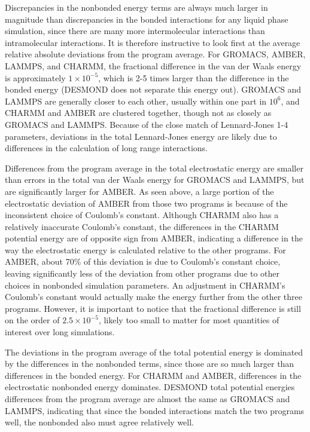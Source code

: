 Discrepancies in the nonbonded energy terms are always much larger in
magnitude than discrepancies in the bonded interactions for any liquid
phase simulation, since there are many more intermolecular
interactions than intramolecular interactions.  It is therefore
instructive to look first at the average relative absolute deviations
from the program average. For GROMACS, AMBER, LAMMPS, and CHARMM, the
fractional difference in the van der Waals energy is approximately
$1\times 10^{-5}$, which is 2-5 times larger than the difference in
the bonded energy (DESMOND does not separate this energy out). GROMACS
and LAMMPS are generally closer to each other, usually within one part
in $10^6$, and CHARMM and AMBER are clustered together, though not as
closely as GROMACS and LAMMPS. Because of the close match of
Lennard-Jones 1-4 parameters, deviations in the total Lennard-Jones
energy are likely due to differences in the calculation of long range
interactions.

Differences from the program average in the total electrostatic energy
are smaller than errors in the total van der Waals energy for GROMACS
and LAMMPS, but are significantly larger for AMBER.  As seen above, a
large portion of the electrostatic deviation of AMBER from those two
programs is because of the inconsistent choice of Coulomb's constant.
Although CHARMM also has a relatively inaccurate Coulomb's constant,
the differences in the CHARMM potential energy are of opposite sign from AMBER, indicating a difference in the way the
electrostatic energy is calculated relative to the other programs.  
For AMBER, about 70\% of this deviation is due to 
Coulomb's constant choice, leaving significantly less of the deviation
from other programs due to other choices in nonbonded simulation
parameters. An adjustment in CHARMM's Coulomb's constant would
actually make the energy further from the other three programs.
However, it is important to notice that the fractional difference is
still on the order of $2.5 \times 10^{-5}$, likely too small to matter
for most quantities of interest over long simulations.

The deviations in the program average of the total potential energy is
dominated by the differences in the nonbonded terms, since those are
so much larger than differences in the bonded energy.  For CHARMM and
AMBER, differences in the electrostatic nonbonded energy
dominates. DESMOND total potential energies differences from the
program average are almost the same as GROMACS and LAMMPS, indicating
that since the bonded interactions match the two programs well, the
nonbonded also must agree relatively well.

